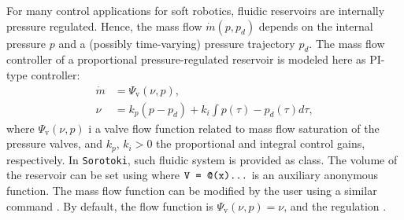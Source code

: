 For many control applications for soft robotics, fluidic reservoirs are internally pressure regulated. Hence, the mass flow $\dot{m}(p,p_d)$ depends on the internal pressure $p$ and a (possibly time-varying) pressure trajectory $p_d$. The mass flow controller of a proportional pressure-regulated reservoir is modeled here as PI-type controller:
%
\begin{align}
    \dot{m} & = \Psi_\textrm{v}(\nu,p),                            \\
    \nu     & = k_p(p - p_d) + k_i \int p(\tau) - p_d(\tau) d\tau,
\end{align}
%
where $\Psi_{\textrm{v}}(\nu,p)$ i a valve flow function related to mass flow saturation of the pressure valves, and $k_p,\,k_i >0$ the proportional and integral control gains, respectively. In \texttt{Sorotoki}, such fluidic system is provided as  class. The volume of the reservoir can be set using  where $\texttt{V = @(x)...}$ is an auxiliary anonymous function. The mass flow function can be modified by the user using a similar command . By default, the flow function is $\Psi_{\textrm{v}}(\nu,p) = \nu$, and the regulation . \\

